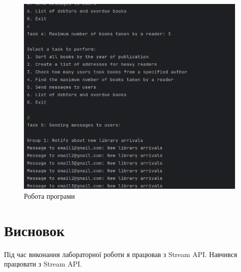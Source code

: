 \documentclass[14pt]{extreport}
\begin{document}
\begin{normalsize}
	\begin{figure}[H]
		\centering
		\includegraphics[scale=0.55]{1}
		\caption{Робота програми}
	\end{figure}

	\section*{Висновок}
	Під час виконання лабораторної роботи я працював з Stream API. Навчився працювати з Stream API.
	 
\end{normalsize}
\end{document}
